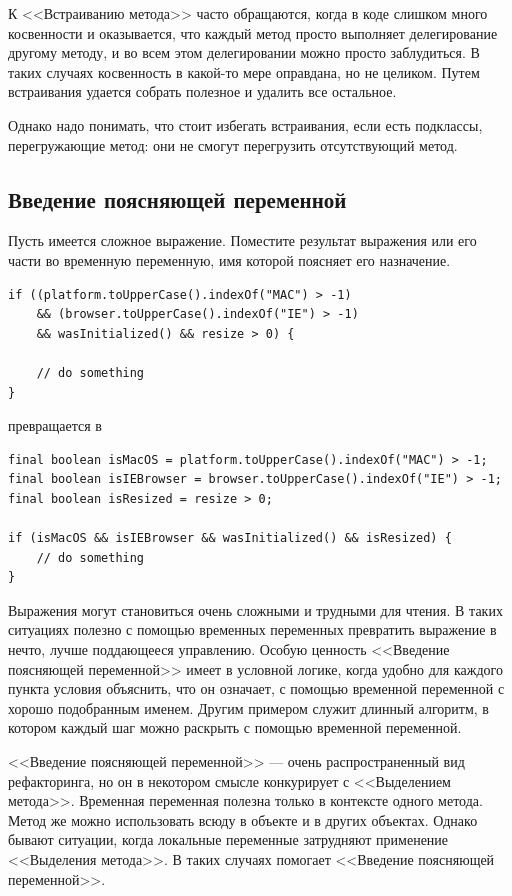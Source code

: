 \documentclass{../../text-style}
\begin{document}
К <<Встраиванию метода>> часто обращаются, когда в коде слишком много косвенности и оказывается, что каждый метод просто выполняет делегирование другому методу, и во всем этом делегировании можно просто заблудиться. В таких случаях косвенность в какой-то мере оправдана, но не целиком. Путем встраивания удается собрать полезное и удалить все остальное.

Однако надо понимать, что стоит избегать встраивания, если есть подклассы, перегружающие метод: они не смогут перегрузить отсутствующий метод.

\subsection{Введение поясняющей переменной}

Пусть имеется сложное выражение. Поместите результат выражения или его части во временную переменную, имя которой поясняет его назначение.

\begin{verbatim}
if ((platform.toUpperCase().indexOf("MAC") > -1)
    && (browser.toUpperCase().indexOf("IE") > -1)
    && wasInitialized() && resize > 0) {

    // do something
}
\end{verbatim}

превращается в 

\begin{verbatim}
final boolean isMacOS = platform.toUpperCase().indexOf("MAC") > -1;
final boolean isIEBrowser = browser.toUpperCase().indexOf("IE") > -1;
final boolean isResized = resize > 0;

if (isMacOS && isIEBrowser && wasInitialized() && isResized) {
    // do something
}
\end{verbatim}

Выражения могут становиться очень сложными и трудными для чтения. В таких ситуациях полезно с помощью временных переменных превратить выражение в нечто, лучше поддающееся управлению. Особую ценность <<Введение поясняющей переменной>> имеет в условной логике, когда удобно для каждого пункта условия объяснить, что он означает, с помощью временной переменной с хорошо подобранным именем. Другим примером служит длинный алгоритм, в котором каждый шаг можно раскрыть с помощью временной переменной.

<<Введение поясняющей переменной>> --- очень распространенный вид рефакторинга, но он в некотором смысле конкурирует с <<Выделением метода>>. Временная переменная полезна только в контексте одного метода. Метод же можно использовать всюду в объекте и в других объектах. Однако бывают ситуации, когда локальные переменные затрудняют применение <<Выделения метода>>. В таких случаях помогает <<Введение поясняющей переменной>>.
\end{document}
